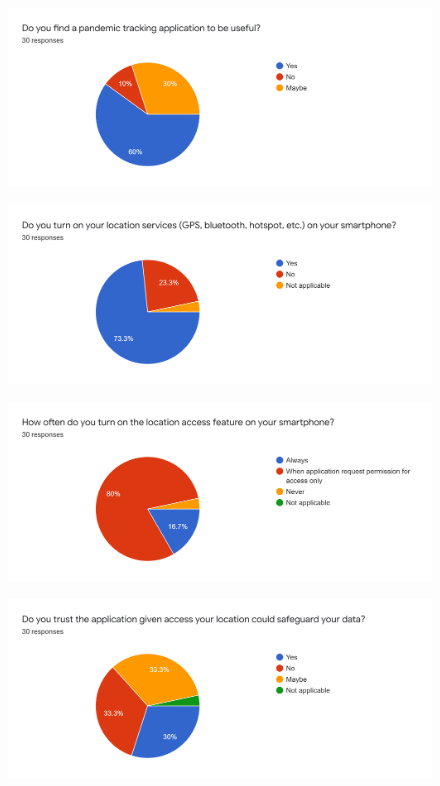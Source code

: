 \begin{appendices}
\begin{figure}[H]
    \end{figure}
    \begin{figure}[H]
      \centering
      \includegraphics[width=\linewidth]{img/Survey/Q4.png}
    \end{figure}
    \begin{figure}[H]
      \centering
      \includegraphics[width=\linewidth]{img/Survey/Q5.png}
    \end{figure}
    \begin{figure}[H]
      \centering
      \includegraphics[width=\linewidth]{img/Survey/Q6.png}
    \end{figure}
    \begin{figure}[H]
      \centering
      \includegraphics[width=\linewidth]{img/Survey/Q7.png}

\end{figure}
\end{appendices}
